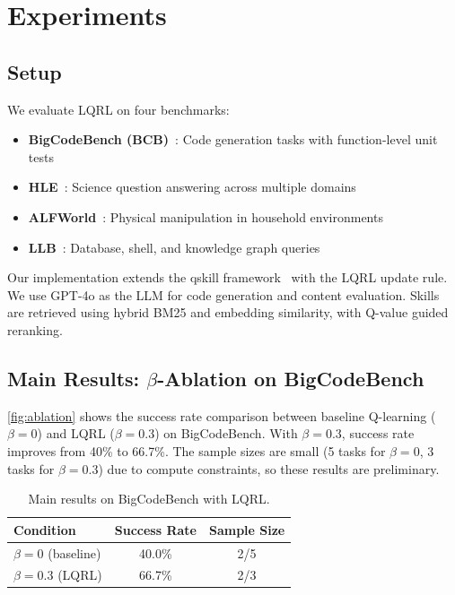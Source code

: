 \section{Experiments}
\label{sec:experiments}

\subsection{Setup}

We evaluate LQRL on four benchmarks:
\begin{itemize}
    \item \textbf{BigCodeBench (BCB)}~\citep{bcb}: Code generation tasks with function-level unit tests
    \item \textbf{HLE}~\citep{hle}: Science question answering across multiple domains
    \item \textbf{ALFWorld}~\citep{alfworld}: Physical manipulation in household environments
    \item \textbf{LLB}~\citep{llb}: Database, shell, and knowledge graph queries
\end{itemize}

Our implementation extends the qskill framework~\citep{qskill} with the LQRL update rule. We use GPT-4o as the LLM for code generation and content evaluation. Skills are retrieved using hybrid BM25 and embedding similarity, with Q-value guided reranking.

\subsection{Main Results: $\beta$-Ablation on BigCodeBench}

\cref{fig:ablation} shows the success rate comparison between baseline Q-learning ($\beta=0$) and LQRL ($\beta=0.3$) on BigCodeBench. With $\beta=0.3$, success rate improves from 40\% to 66.7\%. The sample sizes are small (5 tasks for $\beta=0$, 3 tasks for $\beta=0.3$) due to compute constraints, so these results are preliminary.

\begin{table}[t]
\centering
\caption{Main results on BigCodeBench with LQRL.}
\label{tab:main_results}
\begin{tabular}{lcc}
\toprule
\textbf{Condition} & \textbf{Success Rate} & \textbf{Sample Size} \\
\midrule
$\beta = 0$ (baseline) & 40.0\% & 2/5 \\
$\beta = 0.3$ (LQRL) & 66.7\% & 2/3 \\
\bottomrule
\end{tabular}
\vspace{-0.3em}
\end{table}

